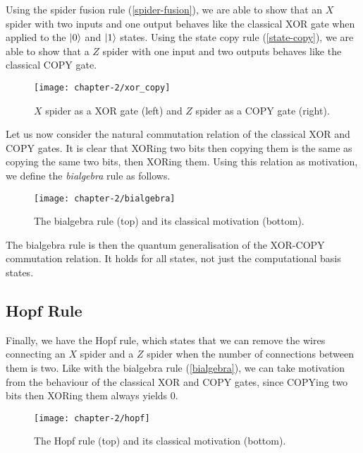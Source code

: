 \begin{center}
\end{center}

Using the spider fusion rule (\ref{spider-fusion}), we are able to show that an $X$ spider with two inputs and one output behaves like the classical XOR gate when applied to the $\ket 0$ and $\ket 1$ states. Using the state copy rule (\ref{state-copy}), we are able to show that a $Z$ spider with one input and two outputs behaves like the classical COPY gate.

\begin{figure}[H]
    \centering
    \texttt{[image: chapter-2/xor\_copy]}
    \caption{$X$ spider as a XOR gate (left) and $Z$ spider as a COPY gate (right).}
\end{figure}

Let us now consider the natural commutation relation of the classical XOR and COPY gates. It is clear that XORing two bits then copying them is the same as copying the same two bits, then XORing them. Using this relation as motivation, we define the \textit{bialgebra} rule as follows.

\begin{figure}[H]
    \centering
    \texttt{[image: chapter-2/bialgebra]}
    \caption{The bialgebra rule (top) and its classical motivation (bottom).}
\end{figure}

The bialgebra rule is then the quantum generalisation of the XOR-COPY commutation relation. It holds for all states, not just the computational basis states.


\subsection{Hopf Rule}%
\label{hopf}

Finally, we have the Hopf rule, which states that we can remove the wires connecting an $X$ spider and a $Z$ spider when the number of connections between them is two. Like with the bialgebra rule (\ref{bialgebra}), we can take motivation from the behaviour of the classical XOR and COPY gates, since COPYing two bits then XORing them always yields 0.

\begin{figure}[H]
    \centering
    \texttt{[image: chapter-2/hopf]}
    \caption{The Hopf rule (top) and its classical motivation (bottom).}
\end{figure}

